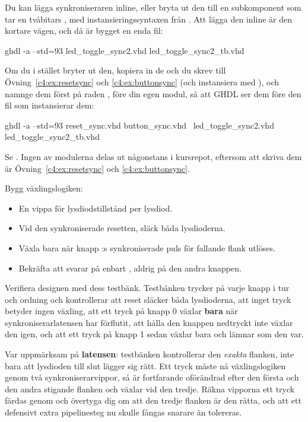 \note[Tips]Du kan lägga synkroniseraren inline, eller bryta ut den till en subkomponent som tar en
tvåbitars , med instansieringssyntaxen från . Att lägga
den inline är den kortare vägen, och då är bygget en enda fil:

\begin{shell}
ghdl -a --std=93 led_toggle_sync2.vhd led_toggle_sync2_tb.vhd
\end{shell}

Om du i stället bryter ut den, kopiera in de  och  du
skrev till Övning~\ref{c4:ex:resetsync} och \ref{c4:ex:buttonsync} (och instansiera
 med ), och namnge dem först på raden , före din
egen modul, så att GHDL ser dem före den fil som instansierar dem:

\begin{shell}
ghdl -a --std=93 reset_sync.vhd button_sync.vhd \
                 led_toggle_sync2.vhd led_toggle_sync2_tb.vhd
\end{shell}

Se . Ingen av modulerna delas ut någonstans i kursrepot, eftersom att
skriva dem är Övning~\ref{c4:ex:resetsync} och \ref{c4:ex:buttonsync}.

 Bygg växlingslogiken:
\begin{itemize}
  \item En vippa för lysdiodstillstånd per lysdiod.
  \item Vid den synkroniserade resetten, släck båda lysdioderna.
  \item Växla \code{led(i)} bara när knapp \code{i}:s synkroniserade puls för fallande flank
    utlöses.
  \item Bekräfta att  svarar på enbart , aldrig på den andra
    knappen.
\end{itemize}

 Verifiera designen med dess testbänk. Testbänken trycker på varje knapp i tur och ordning
och kontrollerar att reset släcker båda lysdioderna, att inget tryck betyder ingen växling, att ett
tryck på knapp 0 växlar \textbf{bara} \code{led(0)} när synkroniserarlatensen har förflutit, att
hålla den knappen nedtryckt inte växlar den igen, och att ett tryck på knapp 1 sedan växlar bara
\code{led(1)} och lämnar \code{led(0)} som den var.

Var uppmärksam på \textbf{latensen}: testbänken kontrollerar den \emph{exakta} flanken, inte bara
att lysdioden till slut lägger sig rätt. Ett tryck måste nå växlingslogiken genom två
synkroniserarvippor, så \code{led} är fortfarande oförändrad efter den första och den andra
stigande flanken och växlar vid den tredje. Räkna vipporna ett tryck färdas genom och övertyga dig
om att den tredje flanken är den rätta, och att ett defensivt extra pipelinesteg nu skulle fångas
snarare än tolereras.


